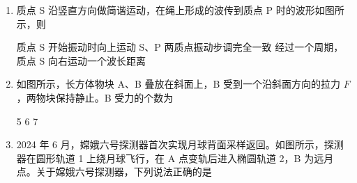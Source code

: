 \documentclass[\gkver]{gaokaozhenti}
\begin{document}
\begin{enumerate}
{C．根据题意，由右手定则可知，线圈转到图示位置时，电流由 B$\to$A，由左手定则可知，AB 边受到的安培力方向向上，故 C 正确；

D．根据题意，由公式 $E_{m} = NBS\omega$ 可知，仅线圈转速加倍，电动势的最大值变为原来的 2 倍，为 $20 \UV$，故 D 错误。

故选 C。
}

\item
质点 S 沿竖直方向做简谐运动，在绳上形成的波传到质点 P 时的波形如图所示，则

\onepicture[w=5.80cm, h=3.07cm]{}

{质点 S 开始振动时向上运动}
{S、P 两质点振动步调完全一致}
{经过一个周期，质点 S 向右运动一个波长距离}


\item
如图所示，长方体物块 A、B 叠放在斜面上，B 受到一个沿斜面方向的拉力 $F$，两物块保持静止。B 受力的个数为

\onepicture[w=5.40cm, h=2.47cm]{}

{5}
{6}
{7}


\item
2024 年 6 月，嫦娥六号探测器首次实现月球背面采样返回。如图所示，探测器在圆形轨道 1 上绕月球飞行，在 A 点变轨后进入椭圆轨道 2，B 为远月点。关于嫦娥六号探测器，下列说法正确的是


\end{enumerate}
\end{document}

